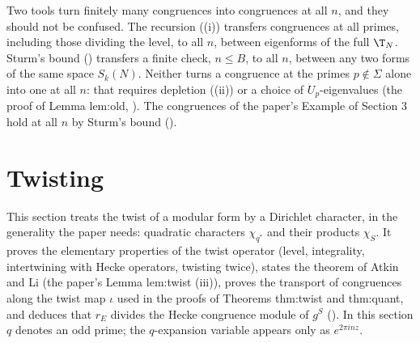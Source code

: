 \begin{remark}\label{rem:hecke:sturm-vs-recursion}
Two tools turn finitely many congruences into congruences at all $n$, and they should not be confused. The recursion ((i)) transfers congruences at all
primes, including those dividing the level, to all $n$, between eigenforms of the full $\T_N$. Sturm's bound () transfers a finite check, $n\le B$, to all $n$, between any two
forms of the same space $S_k(N)$. Neither turns a congruence at the primes $p\notin\Sigma$ alone into one at all $n$: that requires depletion ((ii)) or a choice of
$U_p$-eigenvalues (the proof of Lemma lem:old, ). The congruences of the paper's Example of Section 3 hold at all $n$ by Sturm's bound ().
\end{remark}

\section{Twisting}\label{sec:hecke:twists}

This section treats the twist of a modular form by a Dirichlet character, in the generality the paper needs: quadratic characters $\chi_{q^*}$ and their products $\chi_S$. It
proves the elementary properties of the twist operator (level, integrality, intertwining with Hecke operators, twisting twice), states the theorem of Atkin and Li (the
paper's Lemma lem:twist (iii)), proves the transport of congruences along the twist map $\iota$ used in the proofs of Theorems thm:twist and thm:quant, and deduces that $r_E$
divides the Hecke congruence module of $g^S$ (). In this section
$q$ denotes an odd prime; the $q$-expansion variable appears only as $e^{2\pi inz}$.

